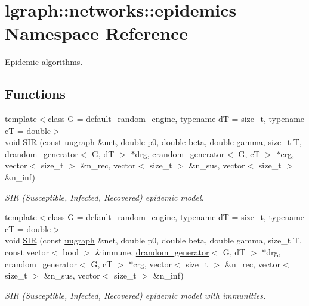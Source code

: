 \hypertarget{namespacelgraph_1_1networks_1_1epidemics}{}\section{lgraph\+:\+:networks\+:\+:epidemics Namespace Reference}
\label{namespacelgraph_1_1networks_1_1epidemics}


Epidemic algorithms.  


\subsection*{Functions}
\begin{DoxyCompactItemize}
\item 
{\footnotesize template$<$class G  = default\+\_\+random\+\_\+engine, typename dT  = size\+\_\+t, typename cT  = double$>$ }\\void \hyperlink{namespacelgraph_1_1networks_1_1epidemics_a1c81e4516170dc49264f27959db20c39}{S\+IR} (const \hyperlink{classlgraph_1_1utils_1_1uugraph}{uugraph} \&net, double p0, double beta, double gamma, size\+\_\+t T, \hyperlink{classlgraph_1_1utils_1_1drandom__generator}{drandom\+\_\+generator}$<$ G, dT $>$ $\ast$drg, \hyperlink{classlgraph_1_1utils_1_1crandom__generator}{crandom\+\_\+generator}$<$ G, cT $>$ $\ast$crg, vector$<$ size\+\_\+t $>$ \&n\+\_\+rec, vector$<$ size\+\_\+t $>$ \&n\+\_\+sus, vector$<$ size\+\_\+t $>$ \&n\+\_\+inf)
\begin{DoxyCompactList}\small\item\em S\+IR (Susceptible, Infected, Recovered) epidemic model. \end{DoxyCompactList}\item 
{\footnotesize template$<$class G  = default\+\_\+random\+\_\+engine, typename dT  = size\+\_\+t, typename cT  = double$>$ }\\void \hyperlink{namespacelgraph_1_1networks_1_1epidemics_a1a8ac0101ab6b5c011db83de5e9fbc2e}{S\+IR} (const \hyperlink{classlgraph_1_1utils_1_1uugraph}{uugraph} \&net, double p0, double beta, double gamma, size\+\_\+t T, const vector$<$ bool $>$ \&immune, \hyperlink{classlgraph_1_1utils_1_1drandom__generator}{drandom\+\_\+generator}$<$ G, dT $>$ $\ast$drg, \hyperlink{classlgraph_1_1utils_1_1crandom__generator}{crandom\+\_\+generator}$<$ G, cT $>$ $\ast$crg, vector$<$ size\+\_\+t $>$ \&n\+\_\+rec, vector$<$ size\+\_\+t $>$ \&n\+\_\+sus, vector$<$ size\+\_\+t $>$ \&n\+\_\+inf)
\begin{DoxyCompactList}\small\item\em S\+IR (Susceptible, Infected, Recovered) epidemic model with immunities. \end{DoxyCompactList}\item 

\end{DoxyCompactItemize}
